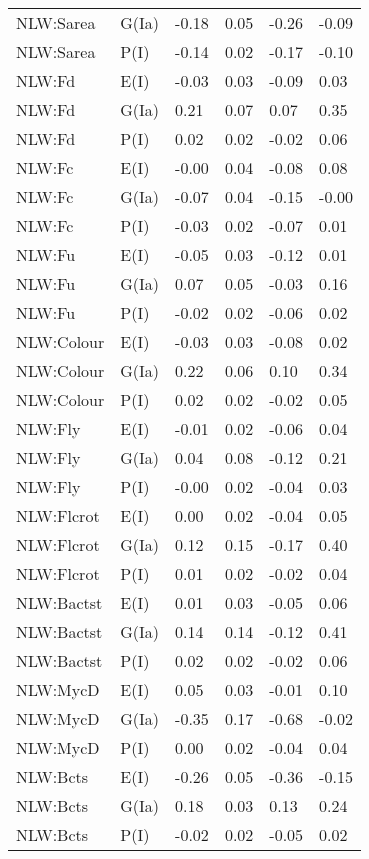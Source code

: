 \begin{center}
\begin{longtable}{|p{1.1in}|p{0.7in}|p{0.7in}|p{0.6in}|p{0.6in}|p{0.6in}|}
  NLW:Sarea & G(Ia) & -0.18 & 0.05 & -0.26 & -0.09 \\ 
  NLW:Sarea & P(I) & -0.14 & 0.02 & -0.17 & -0.10 \\ 
  NLW:Fd & E(I) & -0.03 & 0.03 & -0.09 & 0.03 \\ 
  NLW:Fd & G(Ia) & 0.21 & 0.07 & 0.07 & 0.35 \\ 
  NLW:Fd & P(I) & 0.02 & 0.02 & -0.02 & 0.06 \\ 
  NLW:Fc & E(I) & -0.00 & 0.04 & -0.08 & 0.08 \\ 
  NLW:Fc & G(Ia) & -0.07 & 0.04 & -0.15 & -0.00 \\ 
  NLW:Fc & P(I) & -0.03 & 0.02 & -0.07 & 0.01 \\ 
  NLW:Fu & E(I) & -0.05 & 0.03 & -0.12 & 0.01 \\ 
  NLW:Fu & G(Ia) & 0.07 & 0.05 & -0.03 & 0.16 \\ 
  NLW:Fu & P(I) & -0.02 & 0.02 & -0.06 & 0.02 \\ 
  NLW:Colour & E(I) & -0.03 & 0.03 & -0.08 & 0.02 \\ 
  NLW:Colour & G(Ia) & 0.22 & 0.06 & 0.10 & 0.34 \\ 
  NLW:Colour & P(I) & 0.02 & 0.02 & -0.02 & 0.05 \\ 
  NLW:Fly & E(I) & -0.01 & 0.02 & -0.06 & 0.04 \\ 
  NLW:Fly & G(Ia) & 0.04 & 0.08 & -0.12 & 0.21 \\ 
  NLW:Fly & P(I) & -0.00 & 0.02 & -0.04 & 0.03 \\ 
  NLW:Flcrot & E(I) & 0.00 & 0.02 & -0.04 & 0.05 \\ 
  NLW:Flcrot & G(Ia) & 0.12 & 0.15 & -0.17 & 0.40 \\ 
  NLW:Flcrot & P(I) & 0.01 & 0.02 & -0.02 & 0.04 \\ 
  NLW:Bactst & E(I) & 0.01 & 0.03 & -0.05 & 0.06 \\ 
  NLW:Bactst & G(Ia) & 0.14 & 0.14 & -0.12 & 0.41 \\ 
  NLW:Bactst & P(I) & 0.02 & 0.02 & -0.02 & 0.06 \\ 
  NLW:MycD & E(I) & 0.05 & 0.03 & -0.01 & 0.10 \\ 
  NLW:MycD & G(Ia) & -0.35 & 0.17 & -0.68 & -0.02 \\ 
  NLW:MycD & P(I) & 0.00 & 0.02 & -0.04 & 0.04 \\ 
  NLW:Bcts & E(I) & -0.26 & 0.05 & -0.36 & -0.15 \\ 
  NLW:Bcts & G(Ia) & 0.18 & 0.03 & 0.13 & 0.24 \\ 
  NLW:Bcts & P(I) & -0.02 & 0.02 & -0.05 & 0.02 \\ 

\end{longtable}
\end{center}
